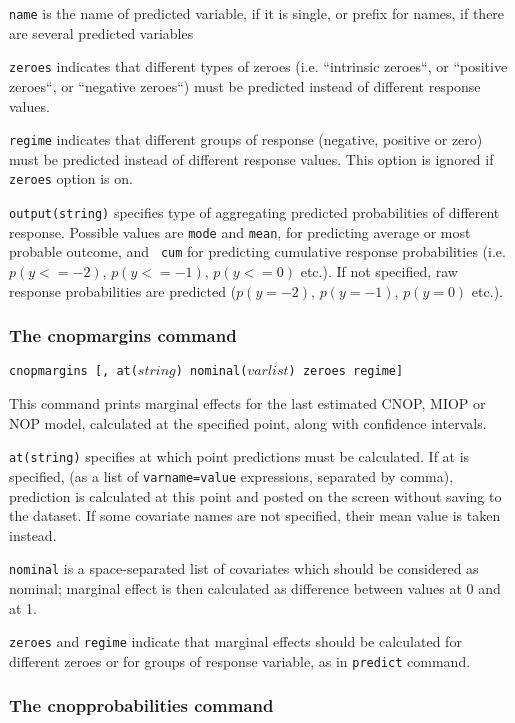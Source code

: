 \documentclass[letterpaper,fleqn,11pt]{article}
\begin{document}
\texttt{name} is the name of predicted variable, if it is single, or prefix
for names, if there are several predicted variables

\texttt{zeroes} indicates that different types of zeroes (i.e. ``intrinsic
zeroes``, or ``positive zeroes``, or ``negative zeroes``) must be predicted
instead of different response values.

\texttt{regime} indicates that different groups of response (negative,
positive or zero) must be predicted instead of different response values.
This option is ignored if \texttt{zeroes} option is on.

\texttt{output(string)} specifies type of aggregating predicted
probabilities of different response. Possible values are \texttt{mode} and 
\texttt{mean}, for predicting average or most probable outcome, and \texttt{%
cum} for predicting cumulative response probabilities (i.e. $p(y <=-2)$, $%
p(y<=-1)$, $p(y<=0)$ etc.). If not specified, raw response probabilities are
predicted ($p(y=-2)$, $p(y=-1)$, $p(y=0)$ etc.).

\subsubsection*{The cnopmargins command}

\texttt{cnopmargins [, at($string$) nominal($varlist$) zeroes regime]}

This command prints marginal effects for the last estimated CNOP, MIOP or
NOP model, calculated at the specified point, along with confidence
intervals.

\texttt{at(string)} specifies at which point predictions must be calculated.
If at is specified, (as a list of \texttt{varname=value} expressions,
separated by comma), prediction is calculated at this point and posted on
the screen without saving to the dataset. If some covariate names are not
specified, their mean value is taken instead.

\texttt{nominal} is a space-separated list of covariates which should be
considered as nominal; marginal effect is then calculated as difference
between values at 0 and at 1.

\texttt{zeroes} and \texttt{regime} indicate that marginal effects should be
calculated for different zeroes or for groups of response variable, as in 
\texttt{predict} command.

\subsubsection*{The cnopprobabilities command}
\end{document}
